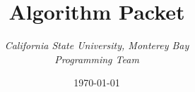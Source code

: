 \documentclass[10pt]{book}
\title{
    Algorithm Packet\\
}
\author{
    \it California State University, Monterey Bay
    \\Programming Team
}
\date{\today}
\begin{document}
                         
    \maketitle
    \tableofcontents
    \cite{Cormen:2009}
    
    
\end{document}
